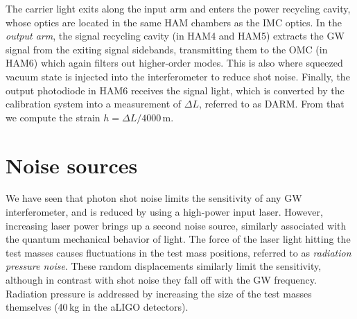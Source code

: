 The carrier light exits along the input arm and enters the power recycling cavity, whose optics are located in the same \ac{HAM} chambers as the \ac{IMC} optics.
In the \textit{output arm}, the signal recycling cavity (in HAM4 and HAM5) extracts the GW signal from the exiting signal sidebands, transmitting them to the \ac{OMC} (in HAM6) which again filters out higher-order modes.
This is also where squeezed vacuum state is injected into the interferometer to reduce shot noise.
Finally, the output photodiode in HAM6 receives the signal light, which is converted by the calibration system into a measurement of $\Delta L$, referred to as \ac{DARM}.
From that we compute the strain $h = \Delta L / 4000$\,m.


\section{Noise sources}\label{sec:noise-sources}

We have seen that photon shot noise limits the sensitivity of any GW interferometer, and is reduced by using a high-power input laser.
However, increasing laser power brings up a second noise source, similarly associated with the quantum mechanical behavior of light.
The force of the laser light hitting the test masses causes fluctuations in the test mass positions, referred to as \textit{radiation pressure noise}.
These random displacements similarly limit the sensitivity, although in contrast with shot noise they fall off with the GW frequency.
Radiation pressure is addressed by increasing the size of the test masses themselves (40\,kg in the aLIGO detectors).

